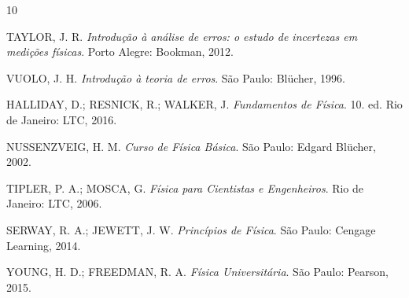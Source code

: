 \documentclass[aps,prb,12pt,onecolumn,amsmath,amssymb]{revtex4-2}
\begin{document}
\begin{thebibliography}{10}

TAYLOR, J. R. \textit{Introdução à análise de erros: o estudo de incertezas em medições físicas}. Porto Alegre: Bookman, 2012.

VUOLO, J. H. \textit{Introdução à teoria de erros}. São Paulo: Blücher, 1996.

HALLIDAY, D.; RESNICK, R.; WALKER, J. \textit{Fundamentos de Física}. 10. ed. Rio de Janeiro: LTC, 2016.

NUSSENZVEIG, H. M. \textit{Curso de Física Básica}. São Paulo: Edgard Blücher, 2002.

TIPLER, P. A.; MOSCA, G. \textit{Física para Cientistas e Engenheiros}. Rio de Janeiro: LTC, 2006.

SERWAY, R. A.; JEWETT, J. W. \textit{Princípios de Física}. São Paulo: Cengage Learning, 2014.

YOUNG, H. D.; FREEDMAN, R. A. \textit{Física Universitária}. São Paulo: Pearson, 2015.

\end{thebibliography}
\end{document}
